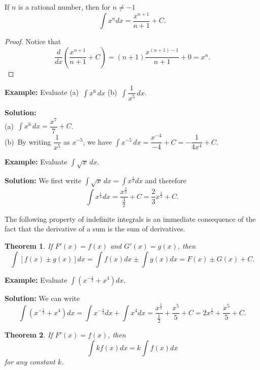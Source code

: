\documentclass[titlepage,a4paper,12pt]{report}
\newtheorem{theorem}{Theorem}[section]
\begin{document}
\noindent If $n$ is a rational number, then for $n\neq -1$
\begin{equation*}
\int x^n dx =\dfrac{x^{n+1}}{n+1}+C.
\end{equation*}
\begin{proof}
Notice that 
\begin{equation*}
\dfrac{d}{dx}\left(\dfrac{x^{n+1}}{n+1}+C\right) =(n+1)\dfrac{x^{(n+1)-1}}{n+1}+0 =x^n.
\end{equation*}
\end{proof}
\noindent \textbf{Example:} Evaluate (a)\, $\displaystyle \int x^6\, dx$ \quad (b)\, $\displaystyle \int \dfrac{1}{x^5}\,  dx$.

\noindent \textbf{Solution:} \\
(a)\, $\displaystyle \int x^6 \, dx =\dfrac{x^7}{7} +C$.\\
(b)\, By writing $\dfrac{1}{x^5}$ as $x^{-5}$, we have $\displaystyle \int x^{-5}\, dx=\dfrac{x^{-4}}{-4}+C =-\dfrac{1}{4x^4}+C$.

\noindent \textbf{Example:} Evaluate $\displaystyle \int \sqrt{x}\,  dx$.

\noindent \textbf{Solution:} We first write $\displaystyle \int \sqrt{x}\, dx =\int x^{\frac{1}{2}}dx$ and therefore 
\begin{equation*}
\int x^{\frac{1}{2}}dx =\dfrac{x^{\frac{3}{2}}}{\frac{3}{2}} +C=\frac{2}{3}x^{\frac{3}{2}} +C.
\end{equation*}

\noindent The following property of indefinite integrals is an immediate consequence of the fact that the derivative of a sum is the sum of derivatives.

\begin{theorem}
If $F'(x)=f(x)$ and $G'(x)=g(x)$, then 
\begin{equation*}
\int [f(x) \pm g(x)]dx=\int f(x)dx \pm \int g(x)dx =F(x) \pm G(x) +C.
\end{equation*}
\end{theorem}
\noindent \textbf{Example:} Evaluate $\displaystyle \int (x^{-\frac{1}{2}}+x^4)dx$.

\noindent \textbf{Solution:} We can write 
\begin{equation*}
\int (x^{-\frac{1}{2}}+x^4)dx =\int x^{-\frac{1}{2}}dx +\int x^4 dx =\frac{x^{\frac{1}{2}}}{\frac{1}{2}}+\frac{x^5}{5}+C=2x^{\frac{1}{2}}+\frac{x^5}{5}+C.
\end{equation*} 
\begin{theorem}
If $F'(x)=f(x)$, then 
\begin{equation*}
\int kf(x)dx=k\int f(x)dx
\end{equation*}
for any constant $k$.
\end{theorem}
\end{document}
